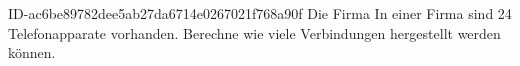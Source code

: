\begin{exercise}
      {ID-ac6be89782dee5ab27da6714e0267021f768a90f}
      {Die Firma}
  \ifproblem\problem
    In einer Firma sind 24 Telefonapparate vorhanden. Berechne wie viele
    Verbindungen hergestellt werden können.
  \fi
\end{exercise}
